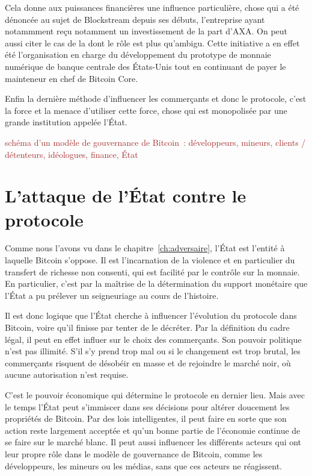 %
Cela donne aux puissances financières une influence particulière, chose qui a été dénoncée au sujet de Blockstream depuis ses débuts, l'entreprise ayant notammment reçu notamment un investissement de la part d'AXA. On peut aussi citer le cas de la  dont le rôle est plus qu'ambigu. Cette initiative a en effet été l'organisation en charge du développement du prototype de monnaie numérique de banque centrale des États-Unis tout en continuant de payer le mainteneur en chef de Bitcoin Core.


Enfin la dernière méthode d'influencer les commerçants et donc le protocole, c'est la force et la menace d'utiliser cette force, chose qui est monopolisée par une grande institution appelée l'État.

\textcolor{brown}{schéma d'un modèle de gouvernance de Bitcoin~: développeurs, mineurs, clients / détenteurs, idéologues, finance, État}

\section*{L'attaque de l'État contre le protocole} %

Comme nous l'avons vu dans le chapitre~\ref{ch:adversaire}, l'État est l'entité à laquelle Bitcoin s'oppose. Il est l'incarnation de la violence et en particulier du transfert de richesse non consenti, qui est facilité par le contrôle sur la monnaie. En particulier, c'est par la maîtrise de la détermination du support monétaire que l'État a pu prélever un seigneuriage au cours de l'histoire.

Il est donc logique que l'État cherche à influencer l'évolution du protocole dans Bitcoin, voire qu'il finisse par tenter de le décréter. Par la définition du cadre légal, il peut en effet influer sur le choix des commerçants. Son pouvoir politique n'est pas illimité. S'il s'y prend trop mal ou si le changement est trop brutal, les commerçants risquent de désobéir en masse et de rejoindre le marché noir, où aucune autorisation n'est requise.

C'est le pouvoir économique qui détermine le protocole en dernier lieu. Mais avec le temps l'État peut s'immiscer dans ses décisions pour altérer doucement les propriétés de Bitcoin. Par des lois intelligentes, il peut faire en sorte que son action reste largement acceptée et qu'un bonne partie de l'économie continue de se faire sur le marché blanc. Il peut aussi influencer les différents acteurs qui ont leur propre rôle dans le modèle de gouvernance de Bitcoin, comme les développeurs, les mineurs ou les médias, sans que ces acteurs ne réagissent.

